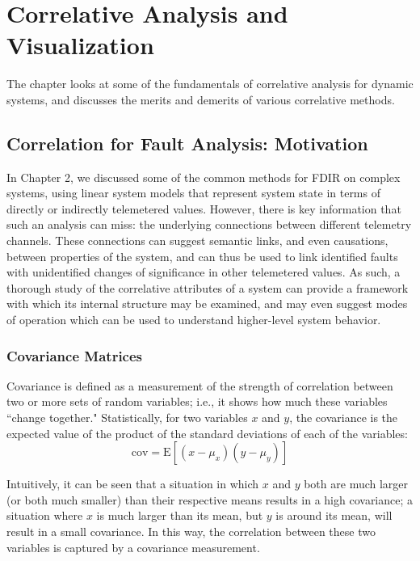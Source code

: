 \chapter{Correlative Analysis and Visualization}

The chapter looks at some of the fundamentals of correlative analysis for dynamic systems, and discusses the merits and demerits of various correlative methods.

\section{Correlation for Fault Analysis: Motivation}

In Chapter 2, we discussed some of the common methods for FDIR on complex systems, using linear system models that represent system state in terms of directly or indirectly telemetered values. However, there is key information that such an analysis can miss: the underlying connections between different telemetry channels. These connections can suggest semantic links, and even causations, between properties of the system, and can thus be used to link identified faults with unidentified changes of significance in other telemetered values. As such, a thorough study of the correlative attributes of a system can provide a framework with which its internal structure may be examined, and may even suggest modes of operation which can be used to understand higher-level system behavior.

\subsection{Covariance Matrices}

Covariance is defined as a measurement of the strength of correlation between two or more sets of random variables; i.e., it shows how much these variables ``change together." Statistically, for two variables $x$ and $y$, the covariance is the expected value of the product of the standard deviations of each of the variables:
\begin{equation} \label{eq:cov}
\mathrm{cov} = \text{E}[(x - \mu_{x})(y - \mu_{y})]
\end{equation}

Intuitively, it can be seen that a situation in which $x$ and $y$ both are much larger (or both much smaller) than their respective means results in a high covariance; a situation where $x$ is much larger than its mean, but $y$ is around its mean, will result in a small covariance. In this way, the correlation between these two variables is captured by a covariance measurement.

